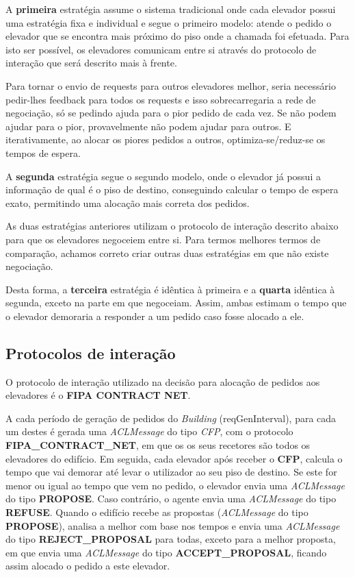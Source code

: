 \documentclass[a4paper]{article}
\begin{document}
A \textbf{primeira} estratégia assume o sistema tradicional onde cada elevador possui uma estratégia fixa e individual e segue o primeiro modelo: atende o pedido o elevador que se encontra mais próximo do piso onde a chamada foi efetuada. Para isto ser possível, os elevadores comunicam entre si através do protocolo de interação que será descrito mais à frente. 

Para tornar o envio de requests para outros elevadores melhor, seria necessário pedir-lhes feedback para todos os requests e isso sobrecarregaria a rede de negociação, só se pedindo ajuda para o pior pedido de cada vez. Se não podem ajudar para o pior, provavelmente não podem ajudar para outros. E iterativamente, ao alocar os piores pedidos a outros, optimiza-se/reduz-se os tempos de espera.

A \textbf{segunda} estratégia segue o segundo modelo, onde o elevador já possui a informação de qual é o piso de destino, conseguindo calcular o tempo de espera exato, permitindo uma alocação mais correta dos pedidos.

As duas estratégias anteriores utilizam o protocolo de interação descrito abaixo para que os elevadores negoceiem entre si. Para termos melhores termos de comparação, achamos correto criar outras duas estratégias em que não existe negociação.

Desta forma, a \textbf{terceira} estratégia é idêntica à primeira e a \textbf{quarta} idêntica à segunda, exceto na parte em que negoceiam. Assim, ambas estimam o tempo que o elevador demoraria a responder a um pedido caso fosse alocado a ele.

\subsection{Protocolos de interação} 

O protocolo de interação utilizado na decisão para alocação de pedidos aos elevadores é o \textbf{FIPA CONTRACT NET}.

A cada período de geração de pedidos do \textit{Building} (reqGenInterval), para cada um destes é gerada uma \textit{ACLMessage} do tipo \textit{CFP}, com o protocolo \textbf{FIPA\_CONTRACT\_NET}, em que os os seus recetores são todos os elevadores do edifício. Em seguida, cada elevador após receber o \textbf{CFP}, calcula o tempo que vai demorar até levar o utilizador ao seu piso de destino. Se este for menor ou igual ao tempo que vem no pedido, o elevador envia uma \textit{ACLMessage} do tipo \textbf{PROPOSE}. Caso contrário, o agente envia uma \textit{ACLMessage} do tipo \textbf{REFUSE}. Quando o edifício recebe as propostas (\textit{ACLMessage} do tipo \textbf{PROPOSE}), analisa a melhor com base nos tempos e envia uma \textit{ACLMessage} do tipo \textbf{REJECT\_PROPOSAL} para todas, exceto para a melhor proposta, em que envia uma \textit{ACLMessage} do tipo \textbf{ACCEPT\_PROPOSAL}, ficando assim alocado o pedido a este elevador.
\end{document}
